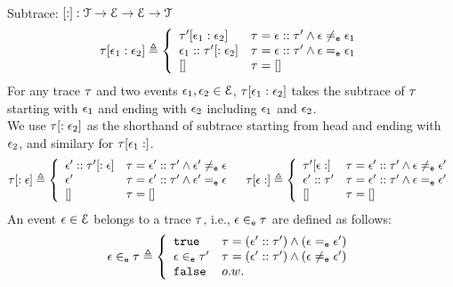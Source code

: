 %
\\
Subtrace: $[ : ] : \mathcal{{T} \to \mathcal{E} \to \mathcal{E} \to \mathcal{T}}$ 
\[
  \trace[\event_1 : \event_2] \triangleq
  \left\{
  \begin{array}{ll} 
  \trace'[\event_1: \event_2]             & \trace = \event :: \trace' \land \event \eventneq \event_1 \\
  \event_1 :: \trace'[:\event_2]  & \trace = \event :: \trace' \land \event \eventeq \event_1 \\
  {[]} & \trace = [] \\
  \end{array}
  \right.
\]
For any trace $\mathtt{\tau}$ and two events $\mathtt{\epsilon}_1, \mathtt{\epsilon}_2 \in \mathcal{E}$,
$\mathtt{\tau}[\mathtt{\epsilon}_1 : \mathtt{\epsilon}_2]$ takes the subtrace of $\mathtt{\tau}$ starting with $\mathtt{\epsilon}_1$ and ending with $\mathtt{\epsilon}_2$ including $\mathtt{\epsilon}_1$ and $\mathtt{\epsilon}_2$.
\\
We use $\mathtt{\tau}[:\mathtt{\epsilon}_2] $ as the shorthand of subtrace starting from head and ending with $\mathtt{\epsilon}_2$, and similary for $\mathtt{\tau}[\mathtt{\epsilon}_1:]$.
\[
  \trace[:\event] \triangleq
  \left\{
  \begin{array}{ll} 
 \event' :: \trace'[: \event]             & \trace = \event' :: \trace' \land \event' \eventneq \event \\
  \event'  & \trace = \event' :: \trace' \land \event' \eventeq \event \\
  {[]}  & \trace = [] 
  \end{array}
  \right.
  \quad
  \trace[\event: ] \triangleq
  \left\{
  \begin{array}{ll} 
  \trace'[\event: ]     & \trace =  \event' :: \trace' \land \event \eventneq \event' \\
  \event' :: \trace'  & \trace = \event' :: \trace' \land \event \eventeq \event' \\
  {[ ] } & \trace = []
  \end{array}
  \right.
\]
%
An event $\mathtt{\epsilon} \in \mathcal{E}$ belongs to a trace $\mathtt{\tau}$, i.e., $\mathtt{\epsilon} \in_{\mathtt{e}} \mathtt{\tau}$ are defined as follows:
%
\begin{equation}
  \event \eventin \trace  
  \triangleq \left\{
  \begin{array}{ll} 
    \etrue                  & \trace =  (\event' :: \trace') \land (\event \eventeq \event')
                              \\
    \event \eventin \trace' & \trace =  (\event' :: \trace') \land (\event \eventneq \event') \\ 
    \efalse                 & o.w.
  \end{array}
  \right.
\end{equation}
